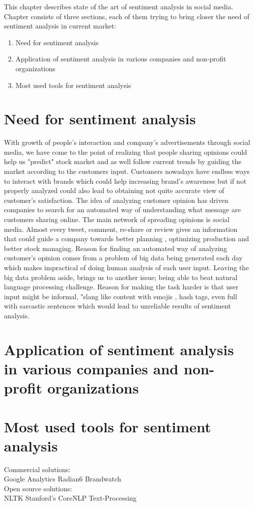 This chapter describes state of the art of sentiment analysis in social media.
Chapter consists of three sections, each of them trying to bring closer the need of sentiment analysis in current market:

\begin{enumerate}
	\item Need for sentiment analysis
	\item Application of sentiment analysis in various companies and non-profit organizations
	\item Most used tools for sentiment analysis
\end{enumerate}

\section{Need for sentiment analysis}
With growth of people's interaction and company's advertisements through social media, we have come to the point of realizing that people sharing opinions could help us "predict" stock market and as well follow current trends by guiding the market according to the customers input.
Customers nowadays have endless ways to interact with brands which could help increasing brand's awareness but if not properly analyzed could also lead to obtaining not quite accurate view of customer's satisfaction.
The idea of analyzing customer opinion has driven companies to search for an automated way of understanding what message are customers sharing online. The main network of spreading opinions is social media. Almost every tweet, comment, re-share or  review gives an information that could guide a company towards better planning , optimizing production and better stock managing.
Reason for finding an automated way of analyzing customer's opinion comes from a problem of big data being generated each day which makes impractical of doing human analysis of each user input. Leaving the big data problem aside, brings us to another issue; being able to beat natural language processing challenge. Reason for making the task harder is that user input might be informal, "slang like content with emojis , hash tags, even full with sarcastic sentences which would lead to unreliable results of sentiment analysis.

\section{Application of sentiment analysis in various companies and non-profit organizations}

\section{Most used tools for sentiment analysis}

Commercial solutions:\\

Google Analytics
Radian6
Brandwatch\\

Open source solutions:\\

NLTK 
Stanford's CoreNLP
Text-Processing\\
